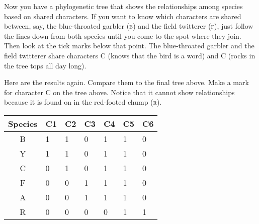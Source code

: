 \documentclass[12pt, addpoints]{exam}
\begin{document}
{

Now you have a phylogenetic tree that shows the relationships among species based on shared characters.  If you want to know which characters are shared between, say, the blue-throated garbler (\textsc{b}) and the field twitterer (\textsc{f}),  just follow the lines down from both species until you come to the spot where they join.  Then look at the tick marks below that point. The blue-throated garbler and the field twitterer share characters C{} (knows that the bird is a word) and C{} (rocks in the tree tops all day long). 

Here are the results again. Compare them to the final tree above. Make a mark for character C{} on the tree above. Notice that it cannot show relationships because it is found on in the red-footed chump (\textsc{r}).

{\liningnum
\begin{longtable}[c]{@{}cC{0.32in}C{0.32in}C{0.32in}C{0.32in}C{0.32in}C{0.32in}@{}}
\toprule
Species & C1 & C2 & C3 & C4 & C5 & C6\tabularnewline
\midrule
B	&
	1	& 
	1	& 
	0	&
	1	&
	1	&
	0	\tabularnewline
%
Y	& 
	1	&
	1	&
	0	&
	1	&
	1	&
	0	\tabularnewline
%
C	&
	0	&
	1	&
	0	&
	1	& 
	1	&
	0	\tabularnewline
%
F	&
	0	&
	0	&
	1	&
	1	&
	1	&
	0	\tabularnewline
%
A	&	
	0	&
	0	&
	1	&
	1	&
	1	&
	0	\tabularnewline
%
R	&
	0	&
	0	&
	0	&
	0	&
	1	&
	1	\tabularnewline
\bottomrule
\end{longtable}
}

}
\end{document}
